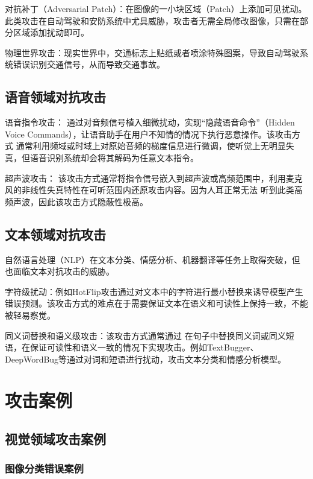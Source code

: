 \documentclass[main]{IEEEtran}
\begin{document}
对抗补丁（Adversarial Patch）：在图像的一小块区域（Patch）上添加可见扰动\cite{brown2017adversarial}。 此类攻击在自动驾驶和安防系统中尤具威胁，攻击者无需全局修改图像，只需在部分区域添加扰动即可。

物理世界攻击：现实世界中，交通标志上贴纸或者喷涂特殊图案，导致自动驾驶系统错误识别交通信号，从而导致交通事故\cite{kurakin2018adversarial}。

\subsection{语音领域对抗攻击}
语音指令攻击： 通过对音频信号植入细微扰动，实现“隐藏语音命令”（Hidden Voice Commands），让语音助手在用户不知情的情况下执行恶意操作\cite{carlini2018audio}。该攻击方式 通常利用频域或时域上对原始音频的梯度信息进行微调，使听觉上无明显失真，但语音识别系统却会将其解码为任意文本指令。

超声波攻击： 该攻击方式通常将指令信号嵌入到超声波或高频范围中，利用麦克风的非线性失真特性在可听范围内还原攻击内容\cite{song2017poster}。因为人耳正常无法 听到此类高频声波，因此该攻击方式隐蔽性极高。

\subsection{文本领域对抗攻击}
自然语言处理（NLP）在文本分类、情感分析、机器翻译等任务上取得突破，但也面临文本对抗攻击的威胁。

字符级扰动：例如HotFlip攻击通过对文本中的字符进行最小替换来诱导模型产生错误预测\cite{ebrahimi2017hotflip}。该攻击方式的难点在于需要保证文本在语义和可读性上保持一致，不能被轻易察觉。

同义词替换和语义级攻击：该攻击方式通常通过 在句子中替换同义词或同义短语，在保证可读性和语义一致的情况下实现攻击。例如TextBugger、DeepWordBug等通过对词和短语进行扰动，攻击文本分类和情感分析模型\cite{li2019textbugger}。

\section{攻击案例}

\subsection{视觉领域攻击案例}
\subsubsection{图像分类错误案例}
\end{document}
